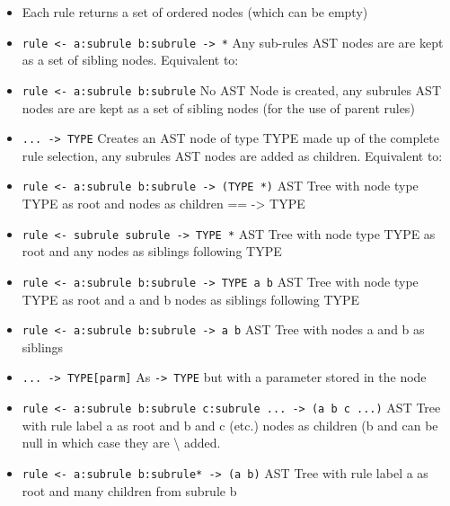 \begin{itemize}
\item Each rule returns a set of ordered nodes (which can be empty)

\item \texttt{rule \textless{}- a:subrule b:subrule -\textgreater{} *} Any sub-rules AST nodes are are kept as a set of sibling nodes. Equivalent to:

\item \texttt{rule \textless{}- a:subrule b:subrule} No AST Node is created, any subrules AST nodes are are kept as a set of sibling nodes (for the use of parent rules)

\item \texttt{... -\textgreater{} TYPE} Creates an AST node of type TYPE made up of the complete rule selection, any subrules AST nodes are added as children. Equivalent to:

\item \texttt{rule \textless{}- a:subrule b:subrule -\textgreater{} (TYPE *)} AST Tree with node type TYPE as root and nodes as children == -\textgreater{} TYPE

\item \texttt{rule \textless{}- subrule subrule -\textgreater{} TYPE *} AST Tree with node type TYPE as root and any nodes as siblings following TYPE

\item \texttt{rule \textless{}- a:subrule b:subrule -\textgreater{} TYPE a b} AST Tree with node type TYPE as root and a and b nodes as siblings following TYPE

\item \texttt{rule \textless{}- a:subrule b:subrule -\textgreater{} a b} AST Tree with nodes a and b as siblings

\item \texttt{... -\textgreater{} TYPE{[}parm{]}} As \texttt{-\textgreater{} TYPE} but with a parameter stored in the node

\item \texttt{rule \textless{}- a:subrule b:subrule c:subrule ... -\textgreater{} (a b c ...)} AST Tree with rule label a as root and b and c (etc.) nodes as children (b and can be null in which case they are \textquotesingle{}\textbackslash{}\textquotesingle{} added.

\item \texttt{rule \textless{}- a:subrule b:subrule* -\textgreater{} (a b)} AST Tree with rule label a as root and many children from subrule b


\end{itemize}
